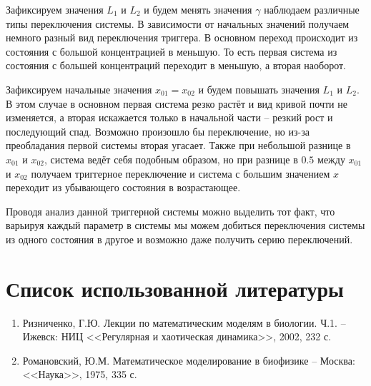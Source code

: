 Зафиксируем значения \( L_1 \) и \( L_2 \) и будем менять значения 
\( \gamma \) наблюдаем различные типы переключения системы. В зависимости 
от начальных значений получаем немного разный вид переключения триггера. 
В основном переход происходит из состояния с большой концентрацией в 
меньшую. То есть первая система из состояния с большей концентраций 
переходит в меньшую, а вторая наоборот.

Зафиксируем начальные значения \( x_{01} = x_{02} \) и будем повышать 
значения \( L_1 \) и \( L_2 \). В этом случае в основном первая система 
резко растёт и вид кривой почти не изменяется, а вторая искажается только в 
начальной части -- резкий рост и последующий спад. Возможно произошло бы 
переключение, но из-за преобладания первой системы вторая угасает. 
Также при небольшой разнице в \( x_{01} \) и \( x_{02} \), система ведёт себя 
подобным образом, но при разнице в \( 0.5 \) между \( x_{01} \) и \( x_{02} \) 
получаем триггерное переключение и система с большим значением \( x \) 
переходит из убывающего состояния в возрастающее.

Проводя анализ данной триггерной системы можно выделить тот факт, что 
варьируя каждый параметр в системы мы можем добиться переключения системы 
из одного состояния в другое и возможно даже получить серию переключений.

\newpage

\section{Список использованной литературы}
    \begin{enumerate}
        \item Ризниченко, Г.Ю. Лекции по математическим моделям в 
            биологии. Ч.1. -- Ижевск: НИЦ
            <<Регулярная и хаотическая динамика>>, 2002, 232 с.
        \item Романовский, Ю.М. Математическое моделирование в биофизике
            -- Москва: <<Наука>>, 1975, 335 с.
    \end{enumerate}